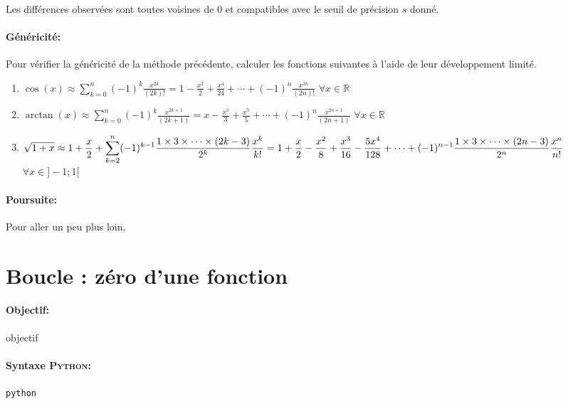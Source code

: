\documentclass[11pt,a4paper,colorlinks,breaklinks]{article}
\def\python{\textsc{Python}}
\begin{document}
\noindent
Les différences observées sont toutes voisines de 0 et compatibles
avec le seuil de précision $s$ donné.

\paragraph{Généricité:} Pour vérifier la généricité de la méthode précédente, 
calculer les fonctions suivantes à l'aide de leur développement limité.
\begin{enumerate}
\item $\displaystyle\cos(x) \approx \sum_{k=0}^{n} (-1)^k\frac{x^{2k}}{(2k)!} = 
		1 - \frac{x^2}{2} + \frac{x^4}{24} + \cdots + (-1)^n\frac{x^{2n}}{(2n)!}$
		\hfill$\forall x \in \mathbb{R}$
\item $\displaystyle\arctan(x) \approx \sum_{k=0}^{n} (-1)^k \frac{x^{2k+1}}{(2k+1)} = 
		x - \frac{x^3}{3} + \frac{x^5}{5} + \cdots + (-1)^n \frac{x^{2n+1}}{(2n+1)}$
		\hfill$\forall x \in \mathbb{R}$
\item $\displaystyle \sqrt{1+x} \approx 1 + \frac{x}{2} + \sum_{k=2}^{n} (-1)^{k-1} 
		\frac{1\times3\times\cdots\times(2k-3)}{2^k} \frac{x^k}{k!} =\\ 
		1 + \frac{x}{2} - \frac{x^2}{8} + \frac{x^3}{16} - \frac{5x^4}{128} + \cdots + (-1)^{n-1} 	
		\frac{1\times3\times\cdots\times(2n-3)}{2^n} \frac{x^n}{n!} $
		\hfill$\forall x \in ]-1;1[$
\end{enumerate}

\paragraph{Poursuite:} Pour aller un peu plus loin,


\newpage
\section{Boucle : zéro d'une fonction}\label{maths:boucles-tests}
\paragraph{Objectif:} objectif

\paragraph{Syntaxe \python:} \texttt{python}
\end{document}
